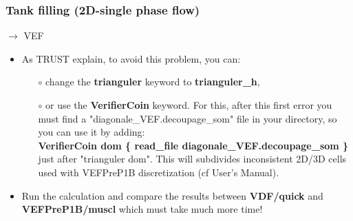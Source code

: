 \documentclass[10pt]{beamer}
\begin{document}
\begin{frame}
\frametitle{Tank filling (2D-single phase flow)}
\begin{block}{$\rightarrow$ VEF}

\begin{itemize}
\item As TRUST explain, to avoid this problem, you can:
    \begin{itemize}
    \item [$\circ$] change the \textbf{trianguler} keyword to \textbf{trianguler\_h}, 
    \item [$\circ$] or use the \textbf{VerifierCoin} keyword. For this, after this first error you must find a "diagonale\_VEF.decoupage\_som" file in your directory, so you can use it by adding:\\
    \textbf{VerifierCoin dom \{ read\_file diagonale\_VEF.decoupage\_som \} }\\
    just after "trianguler dom". This will subdivides inconsistent 2D/3D cells used with VEFPreP1B discretization (cf User's Manual).
    \end{itemize}

\item Run the calculation and compare the results between \textbf{VDF/quick} and \textbf{VEFPreP1B/muscl} which must take much more time!
\end{itemize}

\end{block}
\end{frame}
\end{document}
